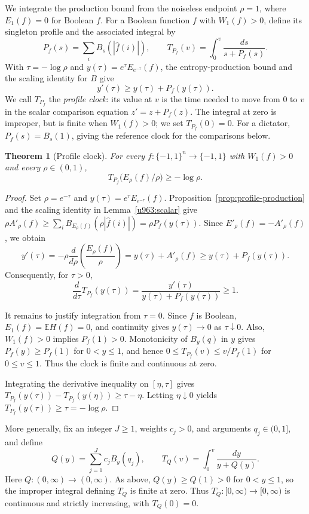 \documentclass[11pt,letterpaper]{amsart}
\newcommand{\E}{\mathbb E}
\newcommand{\1}{\mathbf 1}
\newtheorem{theorem}{Theorem}[section]
\numberwithin{equation}{section}
\begin{document}
We integrate the production bound from the noiseless endpoint
$\rho=1$, where $E_1(f)=0$ for Boolean $f$. For a Boolean function
$f$ with $W_1(f)>0$, define its singleton profile and the associated
integral by
\begin{equation}\label{eq:singleton-clock}
 P_f(s)=\sum_i B_s(|\widehat f(i)|),\qquad
 T_{P_f}(v)=\int_0^v\frac{ds}{s+P_f(s)}.
\end{equation}
With $\tau=-\log\rho$ and
$y(\tau)=e^\tau E_{e^{-\tau}}(f)$, the entropy-production bound
and the scaling identity for $B$ give
\[
 y'(\tau)\ge y(\tau)+P_f(y(\tau)).
\]
We call $T_{P_f}$ the \emph{profile clock}: its value at $v$ is
the time needed to move from $0$ to $v$ in the scalar comparison
equation $z'=z+P_f(z)$. The integral at zero is improper, but is
finite when $W_1(f)>0$; we set $T_{P_f}(0)=0$. For a dictator,
$P_f(s)=B_s(1)$, giving the reference clock for the comparisons
below.

\begin{theorem}[Profile clock]\label{thm:profile-clock}
For every $f:\{-1,1\}^n\to\{-1,1\}$ with $W_1(f)>0$
and every $\rho\in(0,1)$,
\[
 T_{P_f}\bigl(E_\rho(f)/\rho\bigr)\ge-\log\rho.
\]
\end{theorem}

\begin{proof}
Set $\rho=e^{-\tau}$ and
$y(\tau)=e^\tau E_{e^{-\tau}}(f)$.
Proposition~\ref{prop:profile-production} and the scaling
identity in Lemma~\ref{u963:scalar} give
$\rho A'_\rho(f)\ge
\sum_i B_{E_\rho(f)}(\rho|\widehat f(i)|)
=\rho P_f(y(\tau))$.
Since $E'_\rho(f)=-A'_\rho(f)$, we obtain
\[
 y'(\tau)=-\rho\frac{d}{d\rho}\left(\frac{E_\rho(f)}{\rho}\right)=y(\tau)+A'_\rho(f)
 \ge y(\tau)+P_f(y(\tau)).
\]
Consequently, for $\tau>0$,
\[
 \frac{d}{d\tau}T_{P_f}(y(\tau))
 =\frac{y'(\tau)}{y(\tau)+P_f(y(\tau))}\ge1.
\]

It remains to justify integration from $\tau=0$.
Since $f$ is Boolean, $E_1(f)=\E H(f)=0$,
and continuity gives $y(\tau)\to0$ as $\tau\downarrow0$.
Also, $W_1(f)>0$ implies $P_f(1)>0$.
Monotonicity of $B_y(q)$ in $y$ gives
$P_f(y)\ge P_f(1)$ for $0<y\le1$, and hence
$0\le T_{P_f}(v)\le v/P_f(1)$ for $0\le v\le1$.
Thus the clock is finite and continuous at zero.

Integrating the derivative inequality on $[\eta,\tau]$ gives
$T_{P_f}(y(\tau))-T_{P_f}(y(\eta))\ge\tau-\eta$.
Letting $\eta\downarrow0$ yields
$T_{P_f}(y(\tau))\ge\tau=-\log\rho$.
\end{proof}

More generally, fix an integer $J\ge1$, weights $c_j>0$,
and arguments $q_j\in(0,1]$, and define
\begin{equation}\label{eq:fixed-profile-envelope}
 Q(y)=\sum_{j=1}^J c_jB_y(q_j),
 \qquad
 T_Q(v)=\int_0^v\frac{dy}{y+Q(y)}.
\end{equation}
Here $Q:(0,\infty)\to(0,\infty)$.
As above, $Q(y)\ge Q(1)>0$ for $0<y\le1$, so the
improper integral defining $T_Q$ is finite at zero.
Thus $T_Q:[0,\infty)\to[0,\infty)$ is continuous and
strictly increasing, with $T_Q(0)=0$.
\end{document}
